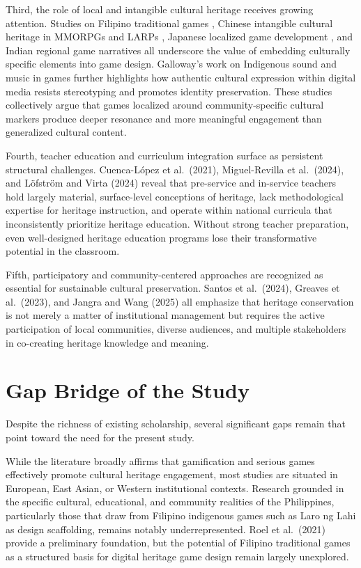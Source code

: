 \documentclass{research}
\begin{document}
Third, the role of local and intangible cultural heritage receives growing attention.
Studies on Filipino traditional games \citep{roel2021}, Chinese intangible cultural
heritage in MMORPGs and LARPs \citep{xu2023}, Japanese localized game development
\citep{yasumasa2024}, and Indian regional game narratives \citep{zeiler2021} all
underscore the value of embedding culturally specific elements into game design.
Galloway's work on Indigenous sound and music in games further highlights how authentic
cultural expression within digital media resists stereotyping and promotes identity
preservation. These studies collectively argue that games localized around
community-specific cultural markers produce deeper resonance and more meaningful
engagement than generalized cultural content.

Fourth, teacher education and curriculum integration surface as persistent structural
challenges. Cuenca-L\'{o}pez et al.\ (2021), Miguel-Revilla et al.\ (2024), and
L\"{o}fstr\"{o}m and Virta (2024) reveal that pre-service and in-service teachers hold
largely material, surface-level conceptions of heritage, lack methodological expertise
for heritage instruction, and operate within national curricula that inconsistently
prioritize heritage education. Without strong teacher preparation, even well-designed
heritage education programs lose their transformative potential in the classroom.

Fifth, participatory and community-centered approaches are recognized as essential for
sustainable cultural preservation. Santos et al.\ (2024), Greaves et al.\ (2023), and
Jangra and Wang (2025) all emphasize that heritage conservation is not merely a matter
of institutional management but requires the active participation of local communities,
diverse audiences, and multiple stakeholders in co-creating heritage knowledge and
meaning.

\section{Gap Bridge of the Study}

Despite the richness of existing scholarship, several significant gaps remain that
point toward the need for the present study.

While the literature broadly affirms that gamification and serious games effectively
promote cultural heritage engagement, most studies are situated in European, East Asian,
or Western institutional contexts. Research grounded in the specific cultural,
educational, and community realities of the Philippines, particularly those that draw
from Filipino indigenous games such as Laro ng Lahi as design scaffolding, remains
notably underrepresented. Roel et al.\ (2021) provide a preliminary foundation, but
the potential of Filipino traditional games as a structured basis for digital heritage
game design remain largely unexplored.
\end{document}
